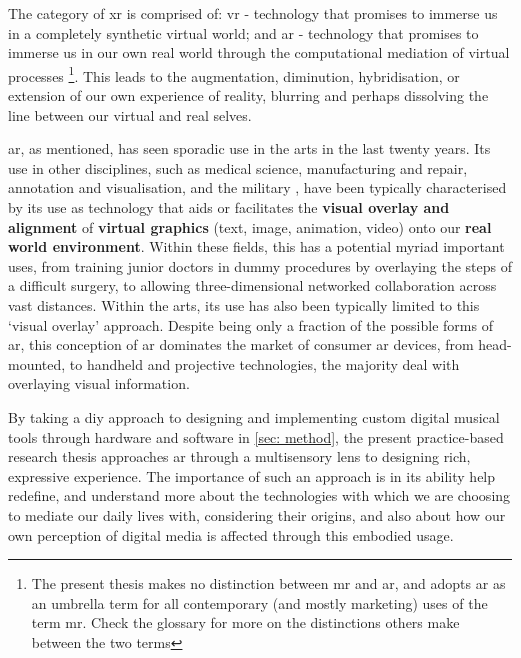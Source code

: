 The category of \ac{xr} is comprised of: \ac{vr} - technology that promises to immerse us in a completely synthetic virtual world; and \ac{ar} - technology that promises to immerse us in our own real world through the computational mediation of virtual processes \footnote{The present thesis makes no distinction between \ac{mr} and \ac{ar}, and adopts \ac{ar} as an umbrella term for all contemporary (and mostly marketing) uses of the term \ac{mr}. Check the glossary for more on the distinctions others make between the two terms}. This leads to the augmentation, diminution, hybridisation, or extension of our own experience of reality, blurring and perhaps dissolving the line between our virtual and real selves.

\ac{ar}, as mentioned, has seen sporadic use in the arts in the last twenty years. Its use in other disciplines, such as medical science, manufacturing and repair, annotation and visualisation, and the military \citep{azuma1997}, have been typically characterised by its use as technology that aids or facilitates the \textbf{visual overlay and alignment} of \textbf{virtual graphics} (text, image, animation, video) onto our \textbf{real world environment}. Within these fields, this has a potential myriad important uses, from training junior doctors in dummy procedures by overlaying the steps of a difficult surgery, to allowing three-dimensional networked collaboration across vast distances. Within the arts, its use has also been typically limited to this `visual overlay' approach. Despite being only a fraction of the possible forms of \ac{ar}, this conception of \ac{ar} dominates the market of consumer \ac{ar} devices, from head-mounted, to handheld and projective technologies, the majority deal with overlaying visual information. 

By taking a \ac{diy} approach to designing and implementing custom digital musical tools through hardware and software in \autoref{sec: method}, the present practice-based research thesis approaches \ac{ar} through a multisensory lens to designing rich, expressive experience. The importance of such an approach is in its ability help redefine, and understand more about the technologies with which we are choosing to mediate our daily lives with, considering their origins, and also about how our own perception of digital media is affected through this embodied usage. 



